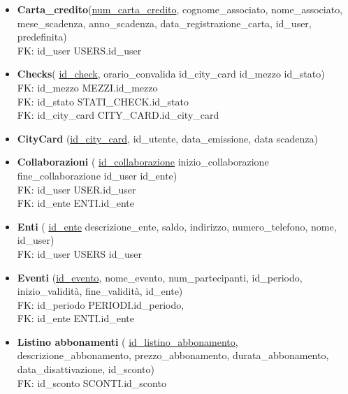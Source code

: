 \begin{itemize}
    \item 
    \textbf{Carta{\_}credito}(\underline{num{\_}carta{\_}credito}, cognome{\_}associato, nome{\_}associato,
    mese{\_}scadenza, anno{\_}scadenza, data{\_}registrazione{\_}carta, id{\_}user,
    predefinita)\\
    FK: id{\_}user \textrightarrow USERS.id{\_}user

    \item 
    \textbf{Checks}(
    \underline{id{\_}check}, 
    orario{\_}convalida
    id{\_}city{\_}card
    id{\_}mezzo
    id{\_}stato)\\
    FK: id{\_}mezzo \textrightarrow MEZZI.id{\_}mezzo\\
    FK: id{\_}stato \textrightarrow STATI{\_}CHECK.id{\_}stato\\
    FK: id{\_}city{\_}card \textrightarrow CITY{\_}CARD.id{\_}city{\_}card\\

    \item 
    \textbf{CityCard}
    (\underline{id{\_}city{\_}card},
    id{\_}utente,
    data{\_}emissione,
    data scadenza)

    \item 
    \textbf{Collaborazioni}
    (
    \underline{id{\_}collaborazione}
    inizio{\_}collaborazione
    fine{\_}collaborazione
    id{\_}user
    id{\_}ente)\\
    FK: id{\_}user \textrightarrow USER.id{\_}user\\
    FK: id{\_}ente \textrightarrow ENTI.id{\_}ente

    \item
    \textbf{Enti}
    (
    \underline{id{\_}ente}
    descrizione{\_}ente,
    saldo,
    indirizzo,
    numero{\_}telefono,
    nome,
    id{\_}user)\\
    FK: id{\_}user \textrightarrow USERS id{\_}user
    
    \item 
    \textbf{Eventi}
    (\underline{id{\_}evento},
    nome{\_}evento,
    num{\_}partecipanti,
    id{\_}periodo,
    inizio{\_}validità,
    fine{\_}validità,
    id{\_}ente)\\
    FK: id{\_}periodo \textrightarrow PERIODI.id{\_}periodo,\\
    FK: id{\_}ente \textrightarrow ENTI.id{\_}ente
    
    \item 
    \textbf{Listino abbonamenti}
    (
    \underline{id{\_}listino{\_}abbonamento},
    descrizione{\_}abbonamento,
    prezzo{\_}abbonamento,
    durata{\_}abbonamento,
    data{\_}disattivazione,
    id{\_}sconto)\\
    FK: id{\_}sconto \textrightarrow SCONTI.id{\_}sconto
    

\end{itemize}
